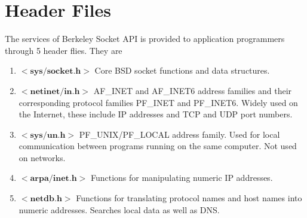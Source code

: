 \section{Header Files}
The services of Berkeley Socket API is provided to application programmers through 5 header flies. They are
\begin{enumerate}
	\item $\mathbf{<sys/socket.h>}$
	Core BSD socket functions and data structures.
	\item  $\mathbf{<netinet/in.h>}$
	AF\_INET and AF\_INET6 address families and their corresponding protocol families PF\_INET and PF\_INET6. Widely used on the Internet, these include IP addresses and TCP and UDP port numbers.
	\item  $\mathbf{<sys/un.h>}$
	PF\_UNIX/PF\_LOCAL address family. Used for local communication between programs running on the same computer. Not used on networks.
	\item  $\mathbf{<arpa/inet.h>}$
	Functions for manipulating numeric IP addresses.
	\item  $\mathbf{<netdb.h>}$
	Functions for translating protocol names and host names into numeric addresses. Searches local data as well as DNS.
\end{enumerate}